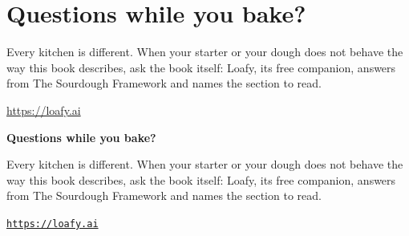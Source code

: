 \ifdefined\HCode
\chapter*{Questions while you bake?}
Every kitchen is different. When your starter or your dough does not behave
the way this book describes, ask the book itself: Loafy, its free companion,
answers from The Sourdough Framework and names the section to read.

\href{https://loafy.ai/loafy?via=tsf-epub-end}{https://loafy.ai}
\else
\clearpage
\thispagestyle{empty}
\vspace*{0.22\textheight}
\begin{center}
{\LARGE\bfseries Questions while you bake?}\par
\bigskip
\begin{minipage}{0.72\textwidth}
\centering
Every kitchen is different. When your starter or your dough does not behave
the way this book describes, ask the book itself: Loafy, its free companion,
answers from The Sourdough Framework and names the section to read.\par
\medskip
\href{https://loafy.ai/loafy?via=tsf-pdf-end}{\nolinkurl{https://loafy.ai}}
\end{minipage}\par
\bigskip\bigskip
\end{center}
\fi
